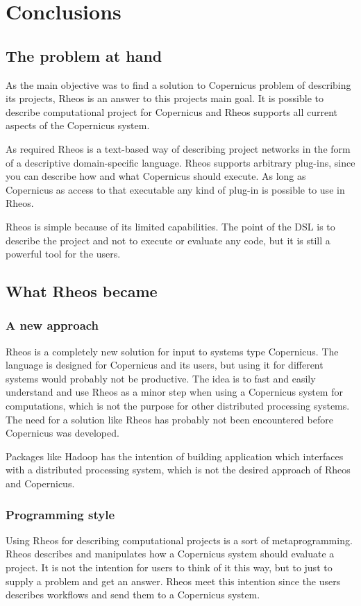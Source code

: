 \chapter{Conclusions}

\section{The problem at hand}
As the main objective was to find a solution to Copernicus problem of
describing its projects, Rheos is an answer to this projects main
goal. It is possible to describe computational project for Copernicus
and Rheos supports all current aspects of the Copernicus system.

As required Rheos is a text-based way of describing project networks
in the form of a descriptive domain-specific language. Rheos supports
arbitrary plug-ins, since you can describe how and what Copernicus
should execute. As long as Copernicus as access to that executable any
kind of plug-in is possible to use in Rheos.

Rheos is simple because of its limited capabilities. The point of the
DSL is to describe the project and not to execute or evaluate any
code, but it is still a powerful tool for the users.


\section{What Rheos became}

\subsection{A new approach}
Rheos is a completely new solution for input to systems type
Copernicus. The language is designed for Copernicus and its users, but
using it for different systems would probably not be productive. The
idea is to fast and easily understand and use Rheos as a minor step
when using a Copernicus system for computations, which is not the
purpose for other distributed processing systems. The need for a
solution like Rheos has probably not been encountered before
Copernicus was developed.

Packages like Hadoop has the intention of building application which
interfaces with a distributed processing system, which is not the
desired approach of Rheos and Copernicus.

\subsection{Programming style}
Using Rheos for describing computational projects is a sort of
metaprogramming. Rheos describes and manipulates how a Copernicus
system should evaluate a project. It is not the intention for users
to think of it this way, but to just to supply a problem and get an
answer. Rheos meet this intention since the users describes workflows
and send them to a Copernicus system.

